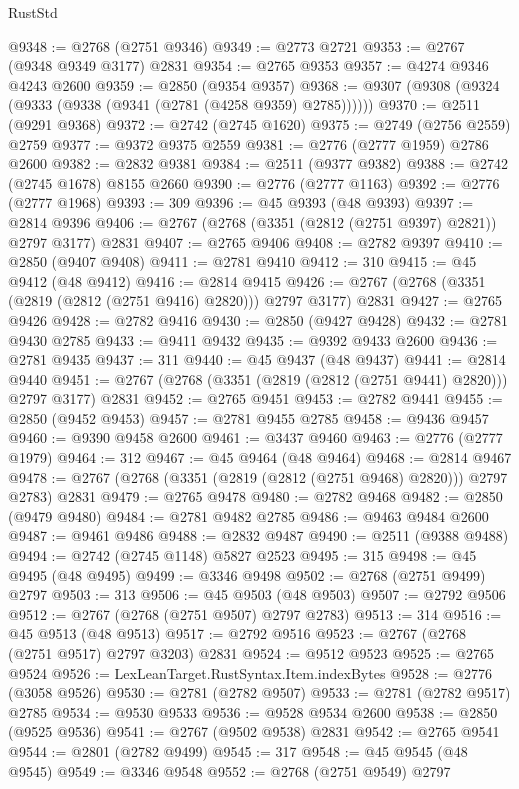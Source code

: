 \begin{lexlean}{RustStd}
\begin{coremodule}
@9348 := @2768 (@2751 @9346)
@9349 := @2773 @2721
@9353 := @2767 (@9348 @9349 @3177) @2831
@9354 := @2765 @9353
@9357 := @4274 @9346 @4243 @2600
@9359 := @2850 (@9354 @9357)
@9368 := @9307 (@9308 (@9324 (@9333 (@9338 (@9341 (@2781 (@4258 @9359) @2785))))))
@9370 := @2511 (@9291 @9368)
@9372 := @2742 (@2745 @1620)
@9375 := @2749 (@2756 @2559) @2759
@9377 := @9372 @9375 @2559
@9381 := @2776 (@2777 @1959) @2786 @2600
@9382 := @2832 @9381
@9384 := @2511 (@9377 @9382)
@9388 := @2742 (@2745 @1678) @8155 @2660
@9390 := @2776 (@2777 @1163)
@9392 := @2776 (@2777 @1968)
@9393 := 309
@9396 := @45 @9393 (@48 @9393)
@9397 := @2814 @9396
@9406 := @2767 (@2768 (@3351 (@2812 (@2751 @9397) @2821)) @2797 @3177) @2831
@9407 := @2765 @9406
@9408 := @2782 @9397
@9410 := @2850 (@9407 @9408)
@9411 := @2781 @9410
@9412 := 310
@9415 := @45 @9412 (@48 @9412)
@9416 := @2814 @9415
@9426 := @2767 (@2768 (@3351 (@2819 (@2812 (@2751 @9416) @2820))) @2797 @3177) @2831
@9427 := @2765 @9426
@9428 := @2782 @9416
@9430 := @2850 (@9427 @9428)
@9432 := @2781 @9430 @2785
@9433 := @9411 @9432
@9435 := @9392 @9433 @2600
@9436 := @2781 @9435
@9437 := 311
@9440 := @45 @9437 (@48 @9437)
@9441 := @2814 @9440
@9451 := @2767 (@2768 (@3351 (@2819 (@2812 (@2751 @9441) @2820))) @2797 @3177) @2831
@9452 := @2765 @9451
@9453 := @2782 @9441
@9455 := @2850 (@9452 @9453)
@9457 := @2781 @9455 @2785
@9458 := @9436 @9457
@9460 := @9390 @9458 @2600
@9461 := @3437 @9460
@9463 := @2776 (@2777 @1979)
@9464 := 312
@9467 := @45 @9464 (@48 @9464)
@9468 := @2814 @9467
@9478 := @2767 (@2768 (@3351 (@2819 (@2812 (@2751 @9468) @2820))) @2797 @2783) @2831
@9479 := @2765 @9478
@9480 := @2782 @9468
@9482 := @2850 (@9479 @9480)
@9484 := @2781 @9482 @2785
@9486 := @9463 @9484 @2600
@9487 := @9461 @9486
@9488 := @2832 @9487
@9490 := @2511 (@9388 @9488)
@9494 := @2742 (@2745 @1148) @5827 @2523
@9495 := 315
@9498 := @45 @9495 (@48 @9495)
@9499 := @3346 @9498
@9502 := @2768 (@2751 @9499) @2797
@9503 := 313
@9506 := @45 @9503 (@48 @9503)
@9507 := @2792 @9506
@9512 := @2767 (@2768 (@2751 @9507) @2797 @2783)
@9513 := 314
@9516 := @45 @9513 (@48 @9513)
@9517 := @2792 @9516
@9523 := @2767 (@2768 (@2751 @9517) @2797 @3203) @2831
@9524 := @9512 @9523
@9525 := @2765 @9524
@9526 := LexLeanTarget.RustSyntax.Item.indexBytes
@9528 := @2776 (@3058 @9526)
@9530 := @2781 (@2782 @9507)
@9533 := @2781 (@2782 @9517) @2785
@9534 := @9530 @9533
@9536 := @9528 @9534 @2600
@9538 := @2850 (@9525 @9536)
@9541 := @2767 (@9502 @9538) @2831
@9542 := @2765 @9541
@9544 := @2801 (@2782 @9499)
@9545 := 317
@9548 := @45 @9545 (@48 @9545)
@9549 := @3346 @9548
@9552 := @2768 (@2751 @9549) @2797

\end{coremodule}
\end{lexlean}

